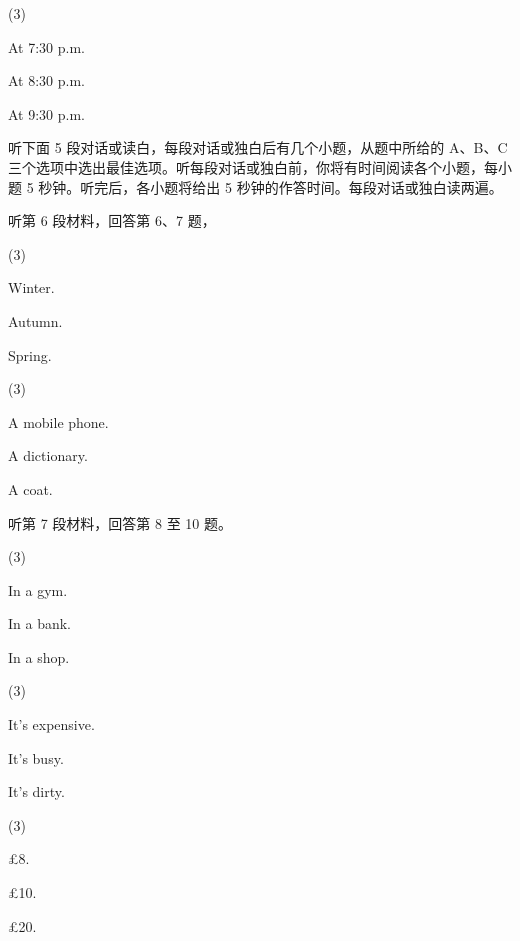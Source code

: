 \documentclass{英语试卷}
\begin{document}
\begin{choices}(3)
  \item At 7:30 p.m.
  \item At 8:30 p.m.
  \item At 9:30 p.m.
\end{choices}
\par 听下面 5 段对话或读白，每段对话或独白后有几个小题，从题中所给的 A、B、C 三个选项中选出最佳选项。听每段对话或独白前，你将有时间阅读各个小题，每小题 5 秒钟。听完后，各小题将给出 5 秒钟的作答时间。每段对话或独白读两遍。\par
\par 听第 6 段材料，回答第 6、7 题，\par
{}
\begin{choices}(3)
  \item Winter.
  \item Autumn.
  \item Spring.
\end{choices}
\begin{choices}(3)
  \item A mobile phone.
  \item A dictionary.
  \item A coat.
\end{choices}
\par 听第 7 段材料，回答第 8 至 10 题。\par
{}
\begin{choices}(3)
  \item In a gym.
  \item In a bank.
  \item In a shop.
\end{choices}
\begin{choices}(3)
  \item It's expensive.
  \item It's busy.
  \item It's dirty.
\end{choices}
\begin{choices}(3)
  \item £8.
  \item £10.
  \item £20.
\end{choices}
\end{document}
